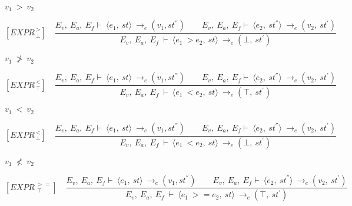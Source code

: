 	
	\begin{math}		
		v_1 \ > \ v_2		
	\end{math} 
	
	
	
	
	
	\newcommand{\exprtrans}[5][E_v, E_a,E_f]{#1\vdash \langle #2, #3 \rangle \mathrel{\to_e} (#4 , #5)}
	
	
	
	
	
	\[	
	[EXPR^{\ >}_{\ \bot}] \quad	
	\dfrac{E_v, \ E_a, \ E_f \vdash \ \langle e_1, \ st \rangle \ \rightarrow_e (v_1, st^{''}) \qquad E_v, \ E_a, \ E_f \vdash \ \langle e_2, \ st^{''} \rangle \ \rightarrow_e (v_2, \ st^{'})}{E_v, \ E_a, \ E_f \ \vdash \ \langle e_1 \ > e_2, \ st \rangle \ \rightarrow_e (\bot, \ st^{'})}
	\]
	
	
	\begin{math}		
		v_1 \ \not> \ v_2		
	\end{math} 
	
	
	
	
	
	\[	
	[EXPR^{\ <}_{\ \top}] \quad	
	\dfrac{E_v, \ E_a, \ E_f \vdash \ \langle e_1, \ st \rangle \ \rightarrow_e (v_1, st^{''}) \qquad E_v, \ E_a, \ E_f \vdash \ \langle e_2, \ st^{''} \rangle \ \rightarrow_e (v_2, \ st^{'})}{E_v, \ E_a, \ E_f \ \vdash \ \langle e_1 \ < e_2, \ st \rangle \ \rightarrow_e (\top, \ st^{'})}
	\]
	
	
	\begin{math}		
		v_1 \ < \ v_2		
	\end{math} 
	
	
	
	
	
	
	
	
	\[	
	[EXPR^{\ <}_{\ \bot}] \quad	
	\dfrac{E_v, \ E_a, \ E_f \vdash \ \langle e_1, \ st \rangle \ \rightarrow_e (v_1, st^{''}) \qquad E_v, \ E_a, \ E_f \vdash \ \langle e_2, \ st^{''} \rangle \ \rightarrow_e (v_2, \ st^{'})}{E_v, \ E_a, \ E_f \ \vdash \ \langle e_1 \ < e_2, \ st \rangle \ \rightarrow_e (\bot, \ st^{'})}	
	\]
	
	
	\begin{math}		
		v_1 \ \not< \ v_2		
	\end{math}
	
	
	
	
	
	\[	
	[EXPR^{\ >=}_{\ \ \top}] \quad	
	\dfrac{E_v, \ E_a, \ E_f \vdash \ \langle e_1, \ st \rangle \ \rightarrow_e (v_1, st^{''}) \qquad E_v, \ E_a, \ E_f \vdash \ \langle e_2, \ st^{''} \rangle \ \rightarrow_e (v_2, \ st^{'})}{E_v, \ E_a, \ E_f \ \vdash \ \langle e_1 \ >= e_2, \ st \rangle \ \rightarrow_e (\top, \ st^{'})}	
	\]
	
